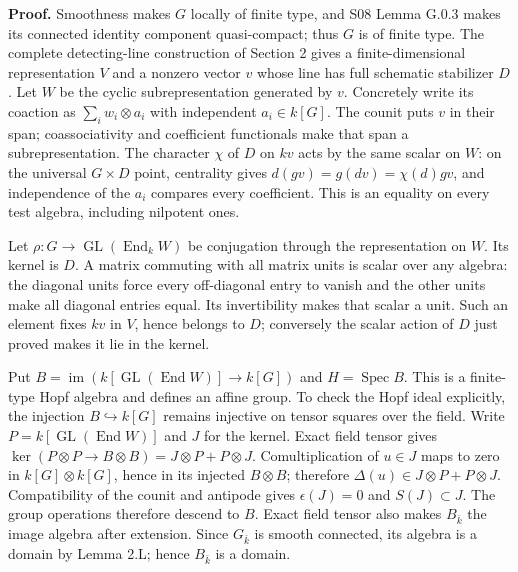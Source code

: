 \documentclass[11pt,a4paper,openany]{report}
\begin{document}
\textbf{Proof.} Smoothness makes \(G\) locally of finite type, and S08 Lemma G.0.3 makes its connected identity component quasi-compact; thus \(G\) is of finite type. The complete detecting-line construction of Section 2 gives a finite-dimensional representation \(V\) and a nonzero vector \(v\) whose line has full schematic stabilizer \(D\). Let \(W\) be the cyclic subrepresentation generated by \(v\). Concretely write its coaction as \(\sum_i w_i\otimes a_i\) with independent \(a_i\in k[G]\). The counit puts \(v\) in their span; coassociativity and coefficient functionals make that span a subrepresentation. The character \(\chi\) of \(D\) on \(kv\) acts by the same scalar on \(W\): on the universal \(G\times D\) point, centrality gives \(d(gv)=g(dv)=\chi(d)gv\), and independence of the \(a_i\) compares every coefficient. This is an equality on every test algebra, including nilpotent ones.

Let \(\rho:G\to\operatorname{GL}(\operatorname{End}_k W)\) be conjugation through the representation on \(W\). Its kernel is \(D\). A matrix commuting with all matrix units is scalar over any algebra: the diagonal units force every off-diagonal entry to vanish and the other units make all diagonal entries equal. Its invertibility makes that scalar a unit. Such an element fixes \(kv\) in \(V\), hence belongs to \(D\); conversely the scalar action of \(D\) just proved makes it lie in the kernel.

Put \(B=\operatorname{im}(k[\operatorname{GL}(\operatorname{End}W)]\to k[G])\) and \(H=\operatorname{Spec}B\). This is a finite-type Hopf algebra and defines an affine group. To check the Hopf ideal explicitly, the injection \(B\hookrightarrow k[G]\) remains injective on tensor squares over the field. Write \(P=k[\operatorname{GL}(\operatorname{End}W)]\) and \(J\) for the kernel. Exact field tensor gives \(\ker(P\otimes P\to B\otimes B)=J\otimes P+P\otimes J\). Comultiplication of \(u\in J\) maps to zero in \(k[G]\otimes k[G]\), hence in its injected \(B\otimes B\); therefore \(\Delta(u)\in J\otimes P+P\otimes J\). Compatibility of the counit and antipode gives \(\epsilon(J)=0\) and \(S(J)\subset J\). The group operations therefore descend to \(B\). Exact field tensor also makes \(B_{\bar k}\) the image algebra after extension. Since \(G_{\bar k}\) is smooth connected, its algebra is a domain by Lemma 2.L; hence \(B_{\bar k}\) is a domain.
\end{document}
